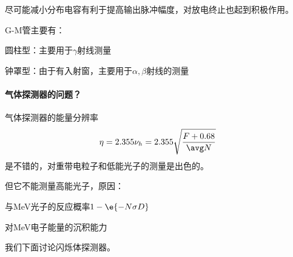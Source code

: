 尽可能减小分布电容有利于提高输出脉冲幅度，对放电终止也起到积极作用。


G-M管主要有：
\begin{compactenum}
	\item 圆柱型：主要用于$\gamma$射线测量
	\item 钟罩型：由于有入射窗，主要用于$\alpha,\beta$射线的测量
\end{compactenum}

\paragraph{气体探测器的问题？}气体探测器的能量分辨率
\[
	\eta=2.355\nu_h=2.355\sqrt{\frac{F+0.68}{\avg N}}
\]
是不错的，对重带电粒子和低能光子的测量是出色的。

但它不能测量高能光子，原因：
\begin{compactenum}
	\item 与MeV光子的反应概率$1-\e{-N\sigma D}$
	\item 对MeV电子能量的沉积能力
\end{compactenum}
我们下面讨论闪烁体探测器。

